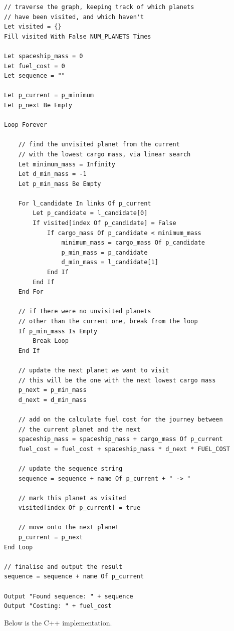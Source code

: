 \documentclass[
]{article}
\begin{document}
\begin{verbatim}
// traverse the graph, keeping track of which planets
// have been visited, and which haven't
Let visited = {}
Fill visited With False NUM_PLANETS Times

Let spaceship_mass = 0
Let fuel_cost = 0
Let sequence = ""

Let p_current = p_minimum
Let p_next Be Empty

Loop Forever

    // find the unvisited planet from the current
    // with the lowest cargo mass, via linear search
    Let minimum_mass = Infinity
    Let d_min_mass = -1
    Let p_min_mass Be Empty

    For l_candidate In links Of p_current
        Let p_candidate = l_candidate[0]
        If visited[index Of p_candidate] = False
            If cargo_mass Of p_candidate < minimum_mass
                minimum_mass = cargo_mass Of p_candidate
                p_min_mass = p_candidate
                d_min_mass = l_candidate[1]
            End If
        End If
    End For

    // if there were no unvisited planets
    // other than the current one, break from the loop
    If p_min_mass Is Empty
        Break Loop
    End If

    // update the next planet we want to visit
    // this will be the one with the next lowest cargo mass
    p_next = p_min_mass
    d_next = d_min_mass

    // add on the calculate fuel cost for the journey between
    // the current planet and the next
    spaceship_mass = spaceship_mass + cargo_mass Of p_current
    fuel_cost = fuel_cost + spaceship_mass * d_next * FUEL_COST

    // update the sequence string
    sequence = sequence + name Of p_current + " -> "

    // mark this planet as visited
    visited[index Of p_current] = true

    // move onto the next planet
    p_current = p_next
End Loop

// finalise and output the result
sequence = sequence + name Of p_current

Output "Found sequence: " + sequence
Output "Costing: " + fuel_cost
\end{verbatim}

Below is the C++ implementation.
\end{document}

